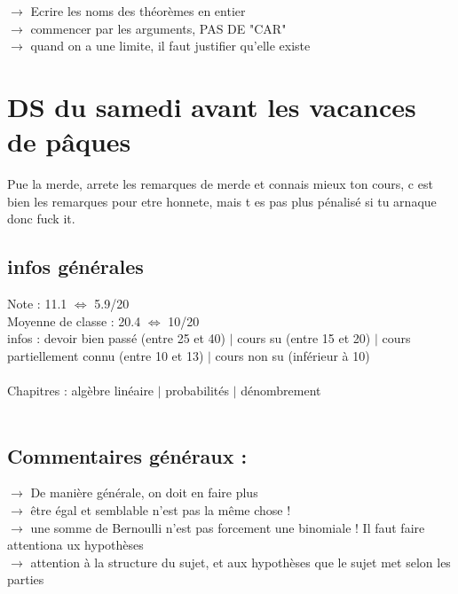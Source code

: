 \documentclass{book}
\begin{document}
$\rightarrow$ Ecrire les noms des théorèmes en entier \\
$\rightarrow$ commencer par les arguments, PAS DE "CAR" \\
$\rightarrow$ quand on a une limite, il faut justifier qu'elle existe \\






\section{DS du samedi avant les vacances de pâques}

\begin{tcolorbox}[width={14cm},colback={yellow!20!white},title={\textbf{Commentaire générale sur ce DS}},colbacktitle=red!40!white,coltitle=black]
	Pue la merde, arrete les remarques de merde et connais mieux ton cours, c est bien les remarques pour etre honnete, mais t es pas plus pénalisé si tu arnaque donc fuck it.
\end{tcolorbox}

\subsection{infos générales}

Note : 11.1 $\Leftrightarrow$ 5.9/20\\
Moyenne de classe : 20.4 $\Leftrightarrow$ 10/20 \\
infos : devoir bien passé (entre 25 et 40) $|$ cours su (entre 15 et 20) $|$ cours partiellement connu (entre 10 et 13) $|$ cours non su (inférieur à  10) \\ \\
Chapitres : algèbre linéaire $|$ probabilités $|$ dénombrement \\ \\

\subsection{Commentaires généraux :}

$\rightarrow$ De manière générale, on doit en faire plus \\
$\rightarrow$ être égal et semblable n'est pas la même chose ! \\
$\rightarrow$ une somme de Bernoulli n'est pas forcement une binomiale ! Il faut faire attentiona ux hypothèses \\
$\rightarrow$ attention à la structure du sujet, et aux hypothèses que le sujet met selon les parties \\
\end{document}
